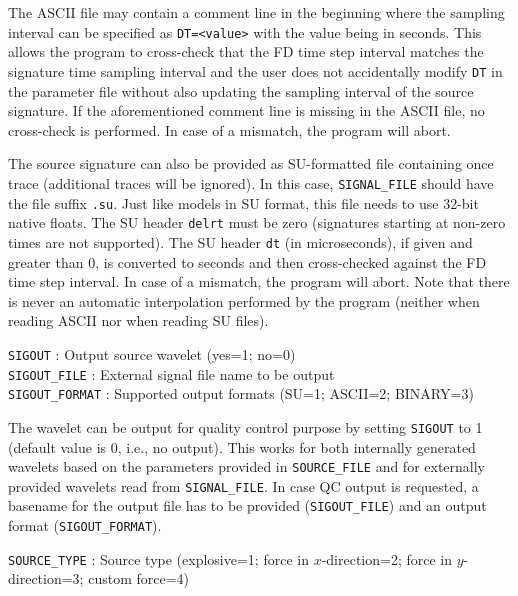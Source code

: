 The ASCII file may contain a comment line in the beginning where the sampling interval can be specified as \texttt{DT=<value>} with the value being in seconds. This allows the program to cross-check that the FD time step interval matches the signature time sampling interval and the user does not accidentally modify \texttt{DT} in the parameter file without also updating the sampling interval of the source signature. If the aforementioned comment line is missing in the ASCII file, no cross-check is performed. In case of a mismatch, the program will abort.

The source signature can also be provided as SU-formatted file containing once trace (additional traces will be ignored). In this case, \texttt{SIGNAL\_FILE} should have the file suffix \texttt{.su}. Just like models in SU format, this file needs to use 32-bit native floats. The SU header \texttt{delrt} must be zero (signatures starting at non-zero times are not supported). The SU header \texttt{dt} (in microseconds), if given and greater than 0, is converted to seconds and then cross-checked against the FD time step interval. In case of a mismatch, the program will abort. Note that there is never an automatic interpolation performed by the program (neither when reading ASCII nor when reading SU files).

\texttt{SIGOUT} : Output source wavelet (yes=1; no=0)\\
\texttt{SIGOUT\_FILE} : External signal file name to be output\\
\texttt{SIGOUT\_FORMAT} : Supported output formats (SU=1; ASCII=2; BINARY=3)

The wavelet can be output for quality control purpose by setting \texttt{SIGOUT} to 1 (default value is 0, i.e., no output). This works for both internally generated wavelets based on the parameters provided in \texttt{SOURCE\_FILE} and for externally provided wavelets read from \texttt{SIGNAL\_FILE}. In case QC output is requested, a basename for the output file has to be provided (\texttt{SIGOUT\_FILE}) and an output format (\texttt{SIGOUT\_FORMAT}).

\texttt{SOURCE\_TYPE} : Source type (explosive=1; force in $x$-direction=2; force in $y$-direction=3; custom force=4)

